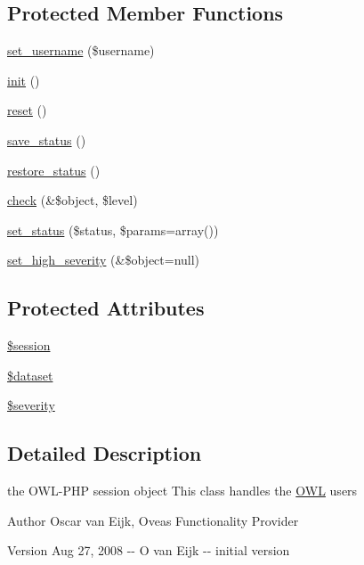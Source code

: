 \subsection*{Protected Member Functions}
\begin{DoxyCompactItemize}
\item 
\hyperlink{classUserHandler_afbcc9a275b547cca0bd4cff567b054a0}{set\_\-username} (\$username)
\item 
\hyperlink{class__OWL_ae0ef3ded56e8a6b34b6461e5a721cd3e}{init} ()
\item 
\hyperlink{class__OWL_a2f2a042bcf31965194c03033df0edc9b}{reset} ()
\item 
\hyperlink{class__OWL_a9e49b9c76fbc021b244c6915ea536d71}{save\_\-status} ()
\item 
\hyperlink{class__OWL_a465eeaf40edd9f9c848841700c32ce55}{restore\_\-status} ()
\item 
\hyperlink{class__OWL_ad6f4f6946f40199dd0333cf219fa500e}{check} (\&\$object, \$level)
\item 
\hyperlink{class__OWL_aea912d0ede9b3c2a69b79072d94d4787}{set\_\-status} (\$status, \$params=array())
\item 
\hyperlink{class__OWL_a576829692a3b66e3d518853bf43abae3}{set\_\-high\_\-severity} (\&\$object=null)
\end{DoxyCompactItemize}
\subsection*{Protected Attributes}
\begin{DoxyCompactItemize}
\item 
\hyperlink{classUserHandler_af097b7fd1ee085b46a6c34e071508a7f}{\$session}
\item 
\hyperlink{classUserHandler_ac38c1ea50b2820ed03781bdbe8eb2e08}{\$dataset}
\item 
\hyperlink{class__OWL_ad26b40a9dbbacb33e299b17826f8327c}{\$severity}
\end{DoxyCompactItemize}


\subsection{Detailed Description}
the OWL-\/PHP session object This class handles the \hyperlink{classOWL}{OWL} users \begin{DoxyAuthor}{Author}
Oscar van Eijk, Oveas Functionality Provider 
\end{DoxyAuthor}
\begin{DoxyVersion}{Version}
Aug 27, 2008 -\/-\/ O van Eijk -\/-\/ initial version 
\end{DoxyVersion}


